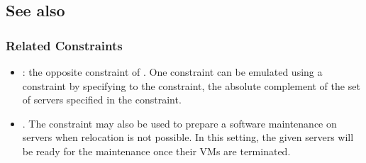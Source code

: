 \subsection{See also}

\subsubsection{Related Constraints}

\begin{itemize}
\item {}: the opposite constraint of . One  constraint can be emulated using a  constraint by specifying to the  constraint, the absolute complement of the set of servers specified in the  constraint.

\item {}. The  constraint may also be used to prepare a software maintenance on servers when relocation is not possible. In this setting, the given servers will be ready for the maintenance once their VMs are terminated.
\end{itemize}

